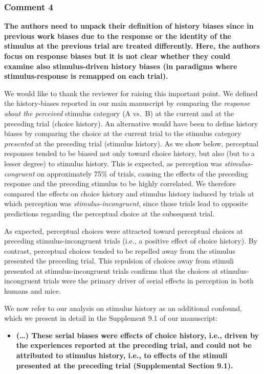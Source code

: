 \documentclass[
]{article}
\providecommand{\tightlist}{%
  \setlength{\itemsep}{0pt}\setlength{\parskip}{0pt}}
\begin{document}
\hypertarget{comment-4-1}{%
\subsubsection{Comment 4}\label{comment-4-1}}

\textbf{The authors need to unpack their definition of history biases
since in previous work biases due to the response or the identity of the
stimulus at the previous trial are treated differently. Here, the
authors focus on response biases but it is not clear whether they could
examine also stimulus-driven history biases (in paradigms where
stimulus-response is remapped on each trial).}

We would like to thank the reviewer for raising this important point. We
defined the history-biases reported in our main manuscript by comparing
the \emph{response about the perceived} stimulus category (A vs.~B) at
the current and at the preceding trial (choice history). An alternative
would have been to define history biases by comparing the choice at the
current trial to the stimulus category \emph{presented} at the preceding
trial (stimulus history). As we show below, perceptual responses tended
to be biased not only toward choice history, but also (but to a lesser
degree) to stimulus history. This is expected, as perception was
\emph{stimulus-congruent} on approximately 75\% of trials, causing the
effects of the preceding response and the preceding stimulus to be
highly correlated. We therefore compared the effects on choice history
and stimulus history induced by trials at which perception was
\emph{stimulus-incongruent}, since those trials lead to opposite
predictions regarding the perceptual choice at the subsequent trial.

As expected, perceptual choices were attracted toward perceptual choices
at preceding stimulus-incongruent trials (i.e., a positive effect of
choice history). By contrast, perceptual choices tended to be repelled
away from the stimulus presented the preceding trial. This repulsion of
choices away from stimuli presented at stimulus-incongruent trials
confirms that the choices at stimulus-incongruent trials were the
primary driver of serial effects in perception in both humans and mice.

We now refer to our analysis on stimulus history as an additional
confound, which we present in detail in the Supplement 9.1 of our
manuscript:

\begin{itemize}
\tightlist
\item
  \textbf{(\ldots) These serial biases were effects of choice history,
  i.e., driven by the experiences reported at the preceding trial, and
  could not be attributed to stimulus history, i.e., to effects of the
  stimuli presented at the preceding trial (Supplemental Section 9.1).}
\end{itemize}
\end{document}

